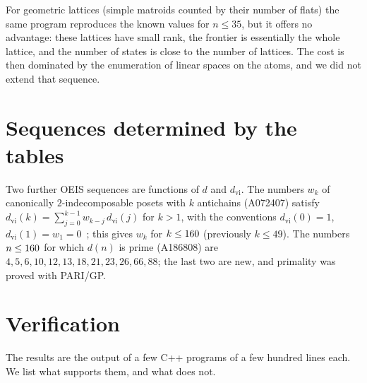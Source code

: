 \documentclass[11pt]{amsart}
\theoremstyle{definition}
\theoremstyle{remark}
\begin{document}
For geometric lattices (simple matroids counted by their number of flats) the same program
reproduces the known values for $n \le 35$, but it offers no advantage: these lattices have
small rank, the frontier is essentially the whole lattice, and the number of states is close
to the number of lattices.  The cost is then dominated by the enumeration of linear spaces
on the atoms, and we did not extend that sequence.

\resultsother

\section{Sequences determined by the tables}\label{sec:further}

Two further OEIS sequences are functions of $d$ and $d_{\mathrm{vi}}$.  The numbers $w_k$ of
canonically $2$-indecomposable posets with $k$ antichains (A072407) satisfy
$d_{\mathrm{vi}}(k) = \sum_{j=0}^{k-1} w_{k-j}\, d_{\mathrm{vi}}(j)$ for $k > 1$, with the conventions
$d_{\mathrm{vi}}(0) = 1$, $d_{\mathrm{vi}}(1) = w_1 = 0$~\cite[Corollary~7]{EHR}; this gives $w_k$ for
$k \le 160$ (previously $k \le 49$).  The numbers $n \le 160$ for which $d(n)$ is prime
(A186808) are $4, 5, 6, 10, 12, 13, 18, 21, 23, 26, 66, 88$; the last two are new, and
primality was proved with PARI/GP.

\section{Verification}\label{sec:verify}

The results are the output of a few C++ programs of a few hundred lines each.  We
list what supports them, and what does not.
\end{document}
